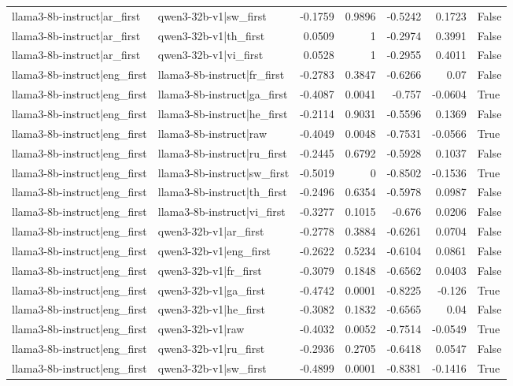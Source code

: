 \begin{table}
\begin{tabular}{l l r r r r l}
llama3-8b-instruct|ar_first & qwen3-32b-v1|sw_first & -0.1759 & 0.9896 & -0.5242 & 0.1723 & False \\
llama3-8b-instruct|ar_first & qwen3-32b-v1|th_first & 0.0509 & 1 & -0.2974 & 0.3991 & False \\
llama3-8b-instruct|ar_first & qwen3-32b-v1|vi_first & 0.0528 & 1 & -0.2955 & 0.4011 & False \\
llama3-8b-instruct|eng_first & llama3-8b-instruct|fr_first & -0.2783 & 0.3847 & -0.6266 & 0.07 & False \\
llama3-8b-instruct|eng_first & llama3-8b-instruct|ga_first & -0.4087 & 0.0041 & -0.757 & -0.0604 & True \\
llama3-8b-instruct|eng_first & llama3-8b-instruct|he_first & -0.2114 & 0.9031 & -0.5596 & 0.1369 & False \\
llama3-8b-instruct|eng_first & llama3-8b-instruct|raw & -0.4049 & 0.0048 & -0.7531 & -0.0566 & True \\
llama3-8b-instruct|eng_first & llama3-8b-instruct|ru_first & -0.2445 & 0.6792 & -0.5928 & 0.1037 & False \\
llama3-8b-instruct|eng_first & llama3-8b-instruct|sw_first & -0.5019 & 0 & -0.8502 & -0.1536 & True \\
llama3-8b-instruct|eng_first & llama3-8b-instruct|th_first & -0.2496 & 0.6354 & -0.5978 & 0.0987 & False \\
llama3-8b-instruct|eng_first & llama3-8b-instruct|vi_first & -0.3277 & 0.1015 & -0.676 & 0.0206 & False \\
llama3-8b-instruct|eng_first & qwen3-32b-v1|ar_first & -0.2778 & 0.3884 & -0.6261 & 0.0704 & False \\
llama3-8b-instruct|eng_first & qwen3-32b-v1|eng_first & -0.2622 & 0.5234 & -0.6104 & 0.0861 & False \\
llama3-8b-instruct|eng_first & qwen3-32b-v1|fr_first & -0.3079 & 0.1848 & -0.6562 & 0.0403 & False \\
llama3-8b-instruct|eng_first & qwen3-32b-v1|ga_first & -0.4742 & 0.0001 & -0.8225 & -0.126 & True \\
llama3-8b-instruct|eng_first & qwen3-32b-v1|he_first & -0.3082 & 0.1832 & -0.6565 & 0.04 & False \\
llama3-8b-instruct|eng_first & qwen3-32b-v1|raw & -0.4032 & 0.0052 & -0.7514 & -0.0549 & True \\
llama3-8b-instruct|eng_first & qwen3-32b-v1|ru_first & -0.2936 & 0.2705 & -0.6418 & 0.0547 & False \\
llama3-8b-instruct|eng_first & qwen3-32b-v1|sw_first & -0.4899 & 0.0001 & -0.8381 & -0.1416 & True \\

\end{tabular}
\end{table}
